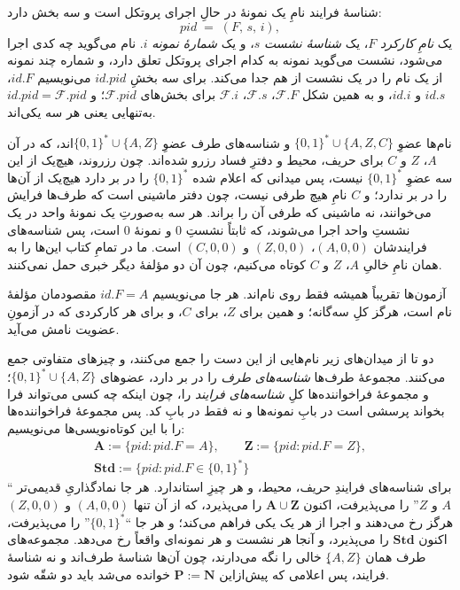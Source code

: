 \documentclass[10pt,oneside,openany]{book}
\newcommand{\Ps}{\mathbf{P}}
\newcommand{\PID}{\mathit{pid}}
\newcommand{\admits}{\mathbf{N}}
\newcommand{\Apid}{\mathbf{A}}
\newcommand{\Zpid}{\mathbf{Z}}
\newcommand{\Stdpid}{\mathbf{Std}}
\newcommand{\F}{\mathcal{F}}
\newcommand{\id}{id}
\newcommand{\bits}{\{0,1\}^*}
\theoremstyle{accentdef}
\theoremstyle{accentplain}
\begin{document}
شناسهٔ فرایند نامِ یک نمونهٔ در حالِ اجرای پروتکل است و سه بخش دارد:
\[
  \PID \;=\; (F,\, s,\, i) ,
\]
یک \emph{نامِ کارکرد} $F$، یک \emph{شناسهٔ نشست} $s$، و یک \emph{شمارهٔ
نمونه} $i$. نام می‌گوید چه کدی اجرا می‌شود، نشست می‌گوید نمونه به کدام
اجرای پروتکل تعلق دارد، و شماره چند نمونه از یک نام را در یک نشست از هم
جدا می‌کند. برای سه بخشِ $\id.\PID$ می‌نویسیم $\id.F$، $\id.s$ و $\id.i$،
و به همین شکل $\F.F$، $\F.s$، $\F.i$ برای بخش‌های $\F.\PID$؛ و $\id.\PID
= \F.\PID$ به‌تنهایی یعنی هر سه یکی‌اند.

نام‌ها عضوِ $\bits \cup \{A,Z,C\}$ و شناسه‌های طرف عضوِ $\bits \cup
\{A,Z\}$اند، که در آن $A$، $Z$ و $C$ برای حریف، محیط و دفترِ فساد
رزرو شده‌اند. چون رزروند، هیچ‌یک از این سه عضوِ $\bits$ نیست، پس میدانی که
اعلام شده $\bits$ را در بر دارد هیچ‌یک از آن‌ها را در بر ندارد؛ و $C$ نامِ
هیچ طرفی نیست، چون دفتر ماشینی است که طرف‌ها فرایش می‌خوانند، نه ماشینی
که طرفی آن را براند. هر سه به‌صورتِ یک نمونهٔ واحد در یک نشستِ واحد اجرا
می‌شوند، که ثابتاً نشستِ $0$ و نمونهٔ $0$ است، پس شناسه‌های فرایندشان
$(A,0,0)$، $(Z,0,0)$ و $(C,0,0)$ است. ما در تمامِ کتاب این‌ها را به همان
نامِ خالیِ $A$، $Z$ و $C$ کوتاه می‌کنیم، چون آن دو مؤلفهٔ دیگر خبری حمل
نمی‌کنند.

آزمون‌ها تقریباً همیشه فقط روی نام‌اند. هر جا می‌نویسیم $\id.F = A$
مقصودمان مؤلفهٔ نام است، هرگز کلِ سه‌گانه؛ و همین برای $Z$، برای $C$، و
برای هر کارکردی که در آزمونِ عضویت نامش می‌آید.

دو تا از میدان‌های زیر نام‌هایی از این دست را جمع می‌کنند، و چیزهای
متفاوتی جمع می‌کنند. مجموعهٔ طرف‌ها \emph{شناسه‌های طرف} را در بر دارد،
عضوهای $\bits \cup \{A,Z\}$؛ و مجموعهٔ فراخواننده‌ها کلِ \emph{شناسه‌های
فرایند} را، چون اینکه چه کسی می‌تواند فرا بخواند پرسشی است در بابِ نمونه‌ها
و نه فقط در بابِ کد. پس مجموعهٔ فراخواننده‌ها را با این کوتاه‌نویسی‌ها
می‌نویسیم:
\[
  \begin{gathered}
  \Apid := \{\PID : \PID.F = A\}, \qquad
  \Zpid := \{\PID : \PID.F = Z\}, \\[3pt]
  \Stdpid := \{\PID : \PID.F \in \bits\}
  \end{gathered}
\]
برای شناسه‌های فرایندِ حریف، محیط، و هر چیزِ استاندارد. هر جا نمادگذاریِ
قدیمی‌تر ``$A$ و $Z$'' را می‌پذیرفت، اکنون $\Apid \cup \Zpid$ را می‌پذیرد،
که از آن تنها $(A,0,0)$ و $(Z,0,0)$ هرگز رخ می‌دهند و اجرا از هر یک یکی
فراهم می‌کند؛ و هر جا ``$\bits$'' را می‌پذیرفت، اکنون $\Stdpid$ را
می‌پذیرد، و آنجا هر نشست و هر نمونه‌ای واقعاً رخ می‌دهد. مجموعه‌های طرف
همان $\{A,Z\}$ِ خالی را نگه می‌دارند، چون آن‌ها شناسهٔ طرف‌اند و نه شناسهٔ
فرایند، پس اعلامی که پیش‌ازاین $\Ps := \admits$ خوانده می‌شد باید دو
شقّه شود.
\end{document}
